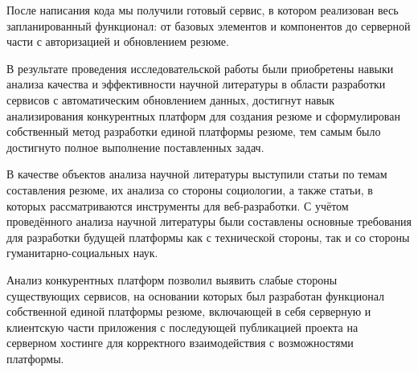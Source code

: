 \documentclass[master, och, diploma]{SCWorks}
\begin{document}
После написания кода мы получили готовый сервис, в котором реализован весь запланированный функционал: от базовых элементов и компонентов до серверной части с авторизацией и обновлением резюме.






\newpage
\conclusion
В результате проведения исследовательской работы были приобретены навыки анализа качества и эффективности научной литературы в области разработки сервисов с автоматическим обновлением данных, достигнут навык анализирования конкурентных платформ для создания резюме и сформулирован собственный метод разработки единой платформы резюме, тем самым было достигнуто полное выполнение поставленных задач.

В качестве объектов анализа научной литературы выступили статьи по темам составления резюме, их анализа со стороны социологии, а также статьи, в которых рассматриваются инструменты для веб-разработки. С учётом проведённого анализа научной литературы были составлены основные требования для разработки будущей платформы как с технической стороны, так и со стороны гуманитарно-социальных наук.

Анализ конкурентных платформ позволил выявить слабые стороны существующих сервисов, на основании которых был разработан функционал собственной единой платформы резюме, включающей в себя серверную и клиентскую части приложения с последующей публикацией проекта на серверном хостинге для корректного взаимодействия с возможностями платформы.







%







\appendix
\end{document}
